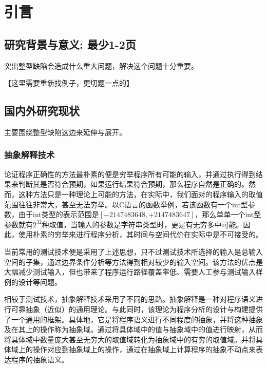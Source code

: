 
\chapter{引言}

 \section{研究背景与意义: 最少1-2页}
 
 突出整型缺陷会造成什么重大问题，解决这个问题十分重要。
 
 【这里需要重新找例子，更切题一点的】
 
 \section{国内外研究现状}
 
 主要围绕整型缺陷这边来延伸与展开。
 
 
 \subsection{抽象解释技术}
 
 论证程序正确性的方法最朴素的便是穷举程序所有可能的输入，并通过执行得到结果来判断其是否符合预期，如果运行结果符合预期，那么程序自然是正确的。然而，这种方法只是一种理论上可能的方法，在实际中，我们面对的程序输入的取值范围往往非常大，甚至无法穷举。以C语言的函数举例，若该函数有一个int型参数，由于int类型的表示范围是$ \left[  -2147483648, +2147483647 \right] $，那么单单一个int型参数就有$ 2^{32}  $种取值，当输入的参数是字符串类型时，更是有无穷多中可能。因此，使用朴素的穷举来进行程序分析，其时间与空间代价在实际中是不可接受的。
 
 当前常用的测试技术便是采用了上述思想，只不过测试技术所选择的输入是总输入空间的子集，通过边界条件分析等方法得到相对较少的输入空间。该方法的优点是大幅减少测试输入，但也带来了程序运行路径覆盖率低、需要人工参与测试输入样例的设计等问题。
 
 相较于测试技术，抽象解释技术采用了不同的思路。抽象解释是一种对程序语义进行可靠抽象（近似）的通用理论\cite{cousot1977abstract}。与此同时，该理论为程序分析的设计与构建提供了一个通用的框架\cite{cousot1979systematic}。具体地，它是将程序语义进行不同程度的抽象，并将这种抽象及在其上的操作称为抽象域。通过将具体域中的值与抽象域中的值进行映射，从而将具体域中数量庞大甚至无穷大的取值域转化为抽象域中的有穷的取值域。并将具体域上的操作对应到抽象域上的操作，通过在抽象域上计算程序的抽象不动点来表达程序的抽象语义。
 
